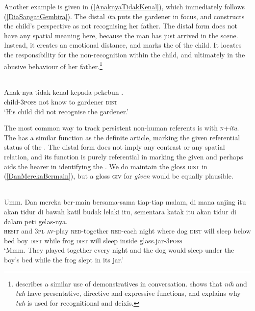 \documentclass[output=paper
,modfonts
,nonflat]{langsci/langscibook}
\begin{document}
\noindent
Another example is given in (\ref{AnaknyaTidakKenal}), which immediately follows  (\ref{DiaSangatGembira}). The distal \emph{itu} puts the gardener in focus, and constructs the child's  perspective as not recognising her father. The distal form does not have any spatial meaning here, because the man has just arrived in the scene. Instead, it creates an emotional distance, and marks the  of the child. It locates the responsibility for the non-recognition within the child, and ultimately in the abusive behaviour of her father.\footnote{\cite{Williams2009} describes a similar use of demonstratives in  conversation. \cite{Djenar2014} shows that \emph{nih} and \emph{tuh} have presentative, directive and expressive functions, and explains why \emph{tuh} is used for recognitional and  deixis.}

\ea\label{AnaknyaTidakKenal} 
\\
\gll Anak-nya      tidak kenal kepada  {\ob}pekebun  .\\
child-\textsc{3poss} not   know  to     gardener \textsc{dist}\\
\glt `His child did not recognise the gardener.'
\z

\noindent
The most common way to track  persistent non-human referents is with \textsc{n}+\emph{itu}. The  has a similar function as the  definite article, marking the given referential status of the . The distal form does not imply any contrast or any spatial relation, and its function is purely referential in marking the given  and perhaps aids the hearer in identifying the . We do maintain the gloss \textsc{dist} in (\ref{DanMerekaBermain}), but a gloss \textsc{giv} for \emph{given} would be equally plausible.

\ea\label{DanMerekaBermain} 
\\
\gll 	Umm.  Dan  mereka ber-main bersama-sama tiap-tiap malam, {di mana}  {\ob}anjing itu{\cb} akan tidur {di bawah}  {\ob}katil  {\ob}{budak lelaki} itu{\cb}{\cb}, sementara  {\ob}katak itu{\cb} akan tidur {di dalam} {peti gelas-nya}.\\
\textsc{hesit} and  \textsc{3pl}    \textsc{av-}play    \textsc{red-}together     \textsc{red}-each   night       where dog    \textsc{dist} will sleep below    bed boy   \textsc{dist}  while     frog  \textsc{dist} will sleep inside   glass.jar-\textsc{3poss}\\
\glt `Mmm. They played together every night and the dog would sleep under the boy's bed while the frog slept in its jar.'
\z
\end{document}
